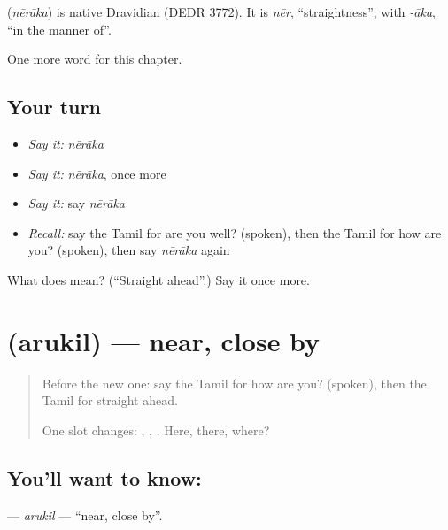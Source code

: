 \begin{cousinweb}
\textbf{} (\emph{nērāka}) is native Dravidian (DEDR 3772). It is \emph{nēr}, \textquotedblleft{}straightness\textquotedblright{}, with \emph{-āka}, \textquotedblleft{}in the manner of\textquotedblright{}.
\end{cousinweb}

\begin{grammarlens}[title={What you've built}]
One more word for this chapter.
\end{grammarlens}

\subsection*{Your turn}
\begin{itemize}
\raggedright
  \item \emph{Say it:} \emph{nērāka}
  \item \emph{Say it:} \emph{nērāka}, once more
  \item \emph{Say it:} say \emph{nērāka}
  \item \emph{Recall:} say the Tamil for are you well? (spoken), then the Tamil for how are you? (spoken), then say \emph{nērāka} again
\end{itemize}

\begin{tcolorbox}[breakable,colback=teal!4,colframe=teal!35!black,title={Before you move on}]
What does  mean? (\textquotedblleft{}Straight ahead\textquotedblright{}.) Say it once more.
\end{tcolorbox}
\section[\texorpdfstring{\ta{அருகில்} (arukil)}{அருகில் (arukil)}]{ (arukil) — near, close by}

\label{lesson:TA-C113-arukil}



\begin{quote}
Before the new one: say the Tamil for how are you? (spoken), then the Tamil for straight ahead.

One slot changes: \textbf{}, \textbf{}, \textbf{}. Here, there, where?
\end{quote}

\subsection*{You'll want to know: }
\textbf{} — \emph{arukil} — \textquotedblleft{}near, close by\textquotedblright{}.

